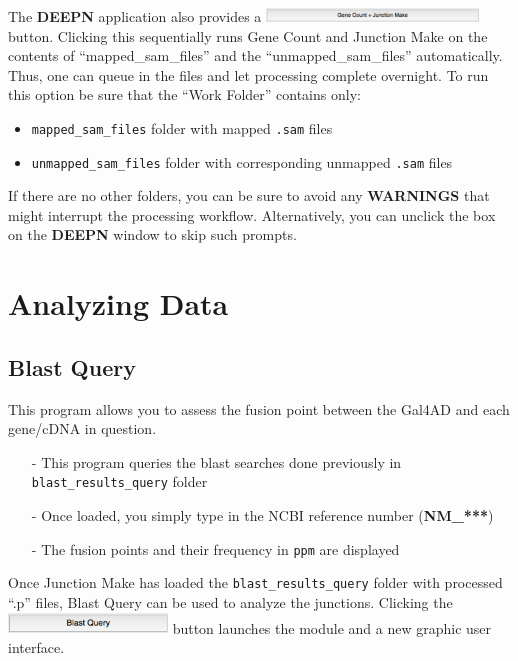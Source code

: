 \documentclass[11pt,fleqn]{book} %
\newcommand{\GeneCount}{{\color{Red} Gene Count }}
\newcommand{\JunctionMake}{{\color{Blue} Junction Make }}
\newcommand{\BlastQuery}{{\color{ForestGreen} Blast Query }}
\newcommand{\DEEPN}{\textbf{DEEPN }}
\begin{document}
The \DEEPN application also provides a \includegraphics[width=160pt]{Pictures/gcjm_btn} button. Clicking this sequentially runs  \GeneCount and \JunctionMake on the contents of ``mapped\_sam\_files'' and the ``unmapped\_sam\_files'' automatically. Thus, one can queue in the files and let processing complete overnight.  To run this option be sure that the ``Work Folder'' contains only:
\begin{itemize} 
    \item \texttt{mapped\_sam\_files} folder with mapped \texttt{.sam} files 
    \item \texttt{unmapped\_sam\_files} folder with corresponding unmapped \texttt{.sam} files
\end{itemize}
If there are no other folders, you can be sure to avoid any \textbf{WARNINGS} that might interrupt the processing workflow.  Alternatively, you can unclick the box on the \DEEPN window to skip such prompts.



\part{Analyzing Data}

\chapter{\BlastQuery}

This program allows you to assess the fusion point between the Gal4AD and each gene/cDNA in question.
\begin{itemize}
    \item[-] This program queries the blast searches done previously in \texttt{blast\_results\_query} folder
    \item[-] Once loaded, you simply type in the NCBI reference number (\textbf{NM\_***})
    \item[-] The fusion points and their frequency in \texttt{ppm} are displayed
\end{itemize}


Once \JunctionMake has loaded the \texttt{blast\_results\_query} folder with processed ``.p'' files, \BlastQuery can be used to analyze the junctions. Clicking the \includegraphics[width=120pt]{Pictures/blast_query} button launches the module and a new graphic user interface.
\end{document}
